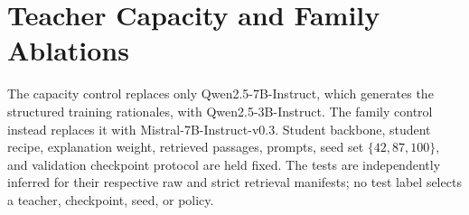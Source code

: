 \documentclass[11pt]{article}
\begin{document}
\section{Teacher Capacity and Family Ablations}\label{app:teacher-capacity}
The capacity control replaces only Qwen2.5-7B-Instruct, which generates the structured training rationales, with Qwen2.5-3B-Instruct. The family control instead replaces it with Mistral-7B-Instruct-v0.3. Student backbone, student recipe, explanation weight, retrieved passages, prompts, seed set $\{42,87,100\}$, and validation checkpoint protocol are held fixed. The tests are independently inferred for their respective raw and strict retrieval manifests; no test label selects a teacher, checkpoint, seed, or policy.

\begin{table}[H]
\centering\scriptsize
{}
\caption{Matched teacher capacity and family ablations. For Qwen2.5 7B minus 3B, raw/strict $\Delta$MF1 are $-.00844/-.00753$; 95\% CIs are $[-.02223,.00562]/[-.02147,.00626]$. For Mistral-7B minus Qwen2.5-7B, they are $-.00021/-.00099$ with CIs $[-.01364,.01274]/[-.01376,.01183]$. Neither contrast resolves statistically.}\label{tab:teacher-capacity}
\end{table}
\end{document}

